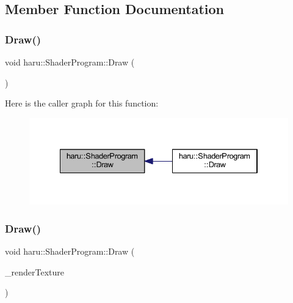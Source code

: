 \subsection{Member Function Documentation}
\mbox{\label{classharu_1_1_shader_program_ab23193ba8426b49073e64646b7de6320}} 
\subsubsection{\texorpdfstring{Draw()}{Draw()}\hspace{0.1cm}{\footnotesize\ttfamily [1/4]}}
{\footnotesize\ttfamily void haru\+::\+Shader\+Program\+::\+Draw (\begin{DoxyParamCaption}{ }\end{DoxyParamCaption})}

Here is the caller graph for this function\+:
\nopagebreak
\begin{figure}[H]
\begin{center}
\leavevmode
\includegraphics[width=334pt]{classharu_1_1_shader_program_ab23193ba8426b49073e64646b7de6320_icgraph}
\end{center}
\end{figure}
\mbox{\label{classharu_1_1_shader_program_a6e322ac38c9358486ccee3c06aef4de1}} 
\subsubsection{\texorpdfstring{Draw()}{Draw()}\hspace{0.1cm}{\footnotesize\ttfamily [2/4]}}
{\footnotesize\ttfamily void haru\+::\+Shader\+Program\+::\+Draw (\begin{DoxyParamCaption}\item[{std\+::shared\+\_\+ptr$<$ \mbox{\hyperlink{classharu_1_1_render_texture}{Render\+Texture}} $>$}]{\+\_\+render\+Texture }\end{DoxyParamCaption})}

